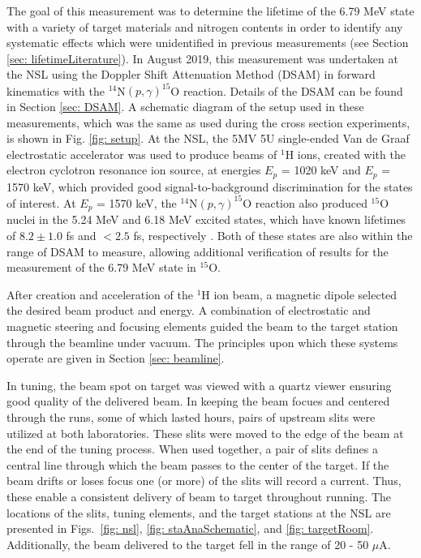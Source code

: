 The goal of this measurement was to determine the lifetime of the 6.79 MeV state with a variety of target materials and nitrogen contents in order to identify any systematic effects which were unidentified in previous measurements (see Section \ref{sec: lifetimeLiterature}). In August 2019, this measurement was undertaken at the NSL using the Doppler Shift Attenuation Method (DSAM) in forward kinematics with the $^{14}$N$\left( p,\gamma \right) ^{15}$O reaction. Details of the DSAM can be found in Section \ref{sec: DSAM}. A schematic diagram of the setup used in these measurements, which was the same as used during the cross section experiments, is shown in Fig. \ref{fig: setup}. At the NSL, the 5MV 5U single-ended Van de Graaf electrostatic accelerator was used to produce beams of $^{1}$H ions, created with the electron cyclotron resonance ion source, at energies $E_{p}$ = 1020 keV and $E_{p}$ = 1570 keV, which provided good signal-to-background discrimination for the states of interest. At $E_{p}$ = 1570 keV, the $^{14}$N$\left( p,\gamma \right) ^{15}$O reaction also produced $^{15}$O nuclei in the 5.24 MeV and 6.18 MeV excited states, which have known lifetimes of $8.2 \pm 1.0$ fs and $< 2.5$ fs, respectively \cite{Ajzenberg-Selove1991}. Both of these states are also within the range of DSAM to measure, allowing additional verification of results for the measurement of the 6.79 MeV state in $^{15}$O.

After creation and acceleration of the $^{1}$H ion beam, a magnetic dipole selected the desired beam product and energy. A combination of electrostatic and magnetic steering and focusing elements guided the beam to the target station through the beamline under vacuum. The principles upon which these systems operate are given in Section \ref{sec: beamline}.

In tuning, the beam spot on target was viewed with a quartz viewer ensuring good quality of the delivered beam. In keeping the beam focues and centered through the runs, some of which lasted hours, pairs of upstream slits were utilized at both laboratories. These slits were moved to the edge of the beam at the end of the tuning process. When used together, a pair of slits defines a central line through which the beam passes to the center of the target. If the beam drifts or loses focus one (or more) of the slits will record a current. Thus, these enable a consistent delivery of beam to target throughout running. The locations of the slits, tuning elements, and the target stations at the NSL are presented in Figs.\ \ref{fig: nsl}, \ref{fig: staAnaSchematic}, and \ref{fig: targetRoom}. Additionally, the beam delivered to the target fell in the range of 20 - 50 $\mu$A.

